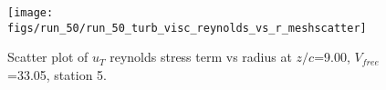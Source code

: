 \begin{figure}[H]
\centering
\texttt{[image: figs/run\_50/run\_50\_turb\_visc\_reynolds\_vs\_r\_meshscatter]}
\caption{Scatter plot of $
u_T$ reynolds stress term vs radius at $z/c$=9.00, $V_{free}$=33.05, station 5.}
\label{fig:run_50_turb_visc_reynolds_vs_r_meshscatter}
\end{figure}



